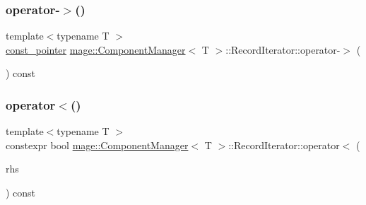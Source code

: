 \subsubsection{\texorpdfstring{operator-\/$>$()}{operator->()}\hspace{0.1cm}{\footnotesize\ttfamily [2/2]}}
{\footnotesize\ttfamily template$<$typename T $>$ \\
\mbox{\hyperlink{classmage_1_1_component_manager_1_1_record_iterator_a08a6c4a38e17c6d73b85d0581646e1d9}{const\+\_\+pointer}} \mbox{\hyperlink{classmage_1_1_component_manager}{mage\+::\+Component\+Manager}}$<$ T $>$\+::Record\+Iterator\+::operator-\/$>$ (\begin{DoxyParamCaption}{ }\end{DoxyParamCaption}) const\hspace{0.3cm}{\ttfamily [delete]}}

\mbox{\label{classmage_1_1_component_manager_1_1_record_iterator_a88678a49ca574b4f8173d1fc9e77b533}} 
\subsubsection{\texorpdfstring{operator$<$()}{operator<()}}
{\footnotesize\ttfamily template$<$typename T $>$ \\
constexpr bool \mbox{\hyperlink{classmage_1_1_component_manager}{mage\+::\+Component\+Manager}}$<$ T $>$\+::Record\+Iterator\+::operator$<$ (\begin{DoxyParamCaption}\item[{const \mbox{\hyperlink{classmage_1_1_component_manager_1_1_record_iterator}{Record\+Iterator}} \&}]{rhs }\end{DoxyParamCaption}) const\hspace{0.3cm}{\ttfamily [noexcept]}}

\mbox{\label{classmage_1_1_component_manager_1_1_record_iterator_a17ee6f33ecaa0afff95f941f916e5cff}} 
